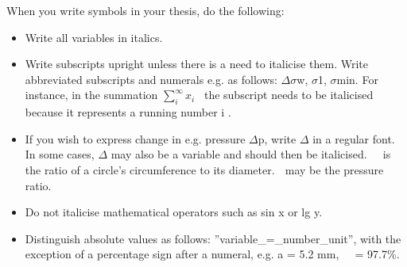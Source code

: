 \documentclass{article}
\begin{document}
\bigskip

When you write symbols in your thesis, do the following: 

\begin{itemize}
\item Write all variables in italics. 
\item Write subscripts upright unless there is a need to italicise them. Write abbreviated subscripts and numerals e.g.
as follows: $\Delta $$\sigma $w, $\sigma $1, $\sigma $min. For instance, in the summation  $\sum _i^{∞}x_i$ \ the
subscript needs to be italicised because it represents a running number i . 
\item If you wish to express change in e.g. pressure $\Delta $p, write $\Delta $ in a regular font. In some cases,
$\Delta $ may also be a variable and should then be italicised. \  is the ratio of a circle’s circumference to its
diameter.  may be the pressure ratio.
\item Do not italicise mathematical operators such as sin x or lg y.
\item Distinguish absolute values as follows: ”variable\_=\_number\_unit”, with the exception of a percentage sign after
a numeral, e.g. a = 5.2 mm,  \ = 97.7\%.
\end{itemize}

\bigskip
\end{document}
